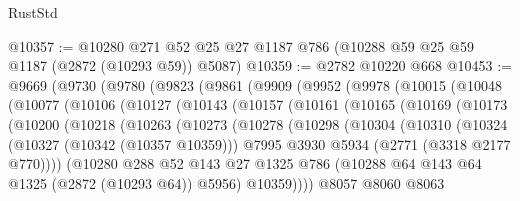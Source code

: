 \begin{lexlean}{RustStd}
\begin{coremodule}
@10357 := @10280 @271 @52 @25 @27 @1187 @786 (@10288 @59 @25 @59 @1187 (@2872 (@10293 @59)) @5087)
@10359 := @2782 @10220 @668
@10453 := @9669
    (@9730
      (@9780
        (@9823
          (@9861
            (@9909
              (@9952
                (@9978
                  (@10015
                    (@10048
                      (@10077
                        (@10106
                          (@10127
                            (@10143
                              (@10157
                                (@10161
                                  (@10165
                                    (@10169
                                      (@10173
                                        (@10200
                                          (@10218
                                            (@10263
                                              (@10273
                                                (@10278
                                                  (@10298
                                                    (@10304
                                                      (@10310
                                                        (@10324
                                                          (@10327 (@10342 (@10357 @10359)))
                                                          @7995
                                                          @3930
                                                          @5934
                                                          (@2771 (@3318 @2177 @770))))
                                                      (@10280
                                                        @288
                                                        @52
                                                        @143
                                                        @27
                                                        @1325
                                                        @786
                                                        (@10288
                                                          @64
                                                          @143
                                                          @64
                                                          @1325
                                                          (@2872 (@10293 @64))
                                                          @5956)
                                                        @10359))))
                                                @8057
                                                @8060
                                                @8063

\end{coremodule}
\end{lexlean}
